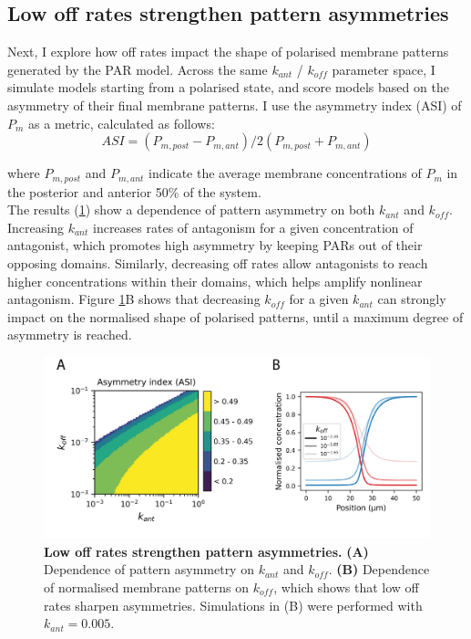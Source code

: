 \documentclass[12pt]{"report"}
\newcommand{\mycaption}[2]{\caption[#1]{\textbf{#1.} #2}}
\begin{document}
\subsection{Low off rates strengthen pattern asymmetries}

Next, I explore how off rates impact the shape of polarised membrane patterns generated by the PAR model. Across the same $k_{ant}$ / $k_{off}$ parameter space, I simulate models starting from a polarised state, and score models based on the asymmetry of their final membrane patterns. I use the asymmetry index (ASI) of $P_m$ as a metric, calculated as follows:
\begin{equation}
ASI = (P_{m, post} - P_{m, ant}) /  2(P_{m, post} + P_{m, ant})
\end{equation}

where $P_{m, post}$ and $P_{m, ant}$ indicate the average membrane concentrations of $P_m$ in the posterior and anterior 50\% of the system.\\

The results (\cref{fig:goehring_model_kant_koff_asi}) show a dependence of pattern asymmetry on both $k_{ant}$ and $k_{off}$. Increasing $k_{ant}$ increases rates of antagonism for a given concentration of antagonist, which promotes high asymmetry by keeping PARs out of their opposing domains. Similarly, decreasing off rates allow antagonists to reach higher concentrations within their domains, which helps amplify nonlinear antagonism. Figure \ref{fig:goehring_model_kant_koff_asi}B shows that decreasing $k_{off}$ for a given $k_{ant}$ can strongly impact on the normalised shape of polarised patterns, until a maximum degree of asymmetry is reached.\\

\begin{figure}
\includegraphics[scale=1]{goehring_model_kant_koff_asi}
\centering
\mycaption{Low off rates strengthen pattern asymmetries}{
\textbf{(A)} Dependence of pattern asymmetry on $k_{ant}$ and $k_{off}$. 
\textbf{(B)} Dependence of normalised membrane patterns on $k_{off}$, which shows that low off rates sharpen asymmetries. Simulations in (B) were performed with $k_{ant} = 0.005$.
}
\label{fig:goehring_model_kant_koff_asi}
\end{figure}
\end{document}
